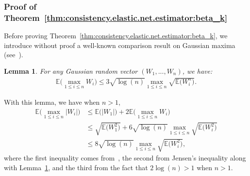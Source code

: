 \documentclass[
  12pt]{article}
\newtheorem{lem}[thm]{Lemma}
\begin{document}
\subsubsection{Proof of Theorem~\ref{thm:consistency.elastic.net.estimator:beta_k}}
\label{section:proof:thm:consistency.elastic.net.estimator:beta_k}
Before proving Theorem~\ref{thm:consistency.elastic.net.estimator:beta_k}, we introduce without proof a well-known comparison result on Gaussian maxima (see~\cite{Ledoux-Talagrand:1991}).  
\begin{lem}
	\label{lem:concentration.inequality:Ledoux.Talagrand.1991}
	For any Gaussian random vector $(W_{1}, ..., W_{n})$, we have:
	\begin{align}
		\mathbb{E} \Big( \max_{1 \leq i \leq n} W_{i} \Big)  \leq  3 \sqrt{\log(n)} \max_{1 \leq i \leq n} \sqrt{ \mathbb{E} \big( W_{i}^{n} \big) } .  
	\end{align}
\end{lem}
With this lemma, we have when $n > 1$, 
\begin{align}
	\mathbb{E} \Big( \max_{1 \leq i \leq n} \big| W_{i} \big| \Big)   &\leq    \mathbb{E} \big( |W_{1}| \big) + 2 \mathbb{E} \Big( \max_{1 \leq i \leq n} W_{i} \Big)   
	\nonumber   
	\\
	&\leq   \sqrt{ \mathbb{E} \big( W_{1}^{2} \big) }  +  6 \sqrt{\log(n)} \max_{1 \leq i \leq n} \sqrt{ \mathbb{E} \big( W_{i}^{2} \big) }  
	\nonumber   
	\\
	&\leq  8 \sqrt{\log(n)} \max_{1 \leq i \leq n}  \sqrt{ \mathbb{E} \big( W_{i}^{2} \big) } ,
	\label{lem:concentration.inequality:Ledoux.Talagrand.1991:inequa2}  
\end{align} 
where the first inequality comes from~\cite{Ledoux-Talagrand:1991}, the second from Jensen's inequality along with Lemma~\ref{lem:concentration.inequality:Ledoux.Talagrand.1991}, and the third from the fact that $2 \log(n) >  1$ when $n > 1$.   

\medskip 
\end{document}
